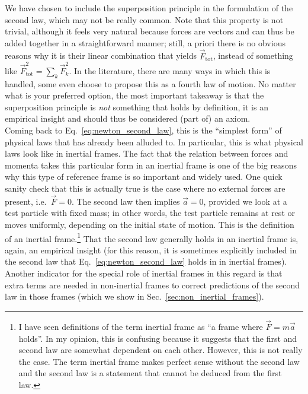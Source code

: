 \documentclass[../class_mech_main.tex]{subfiles}
\begin{document}
We have chosen to include the superposition principle in the formulation of the second law, which may not be really common. Note that this property is not trivial, although it feels very natural because forces are vectors and can thus be added together in a straightforward manner; still, a priori there is no obvious reasons why it is their linear combination that yields $\vec{F}_\mathrm{tot}$, instead of something like $\vec{F}_\mathrm{tot}^2 = \sum_k \vec{F}_k^2$. In the literature, there are many ways in which this is handled, some even choose to propose this as a fourth law of motion. No matter what is your preferred option, the most important takeaway is that the superposition principle is \emph{not} something that holds by definition, it is an empirical insight and should thus be considered (part of) an axiom.\\


Coming back to Eq.~\eqref{eq:newton_second_law}, this is the \enquote{simplest form} of physical laws that has already been alluded to. In particular, this is what physical laws look like in inertial frames. The fact that the relation between forces and momenta takes this particular form in an inertial frame is one of the big reasons why this type of reference frame is so important and widely used. One quick sanity check that this is actually true is the case where no external forces are present, i.e.~$\vec{F} = 0$. The second law then implies $\vec{a} = 0$, provided we look at a test particle with fixed mass; in other words, the test particle remains at rest or moves uniformly, depending on the initial state of motion. This is the definition of an inertial frame.\footnote{I have seen definitions of the term inertial frame as \enquote{a frame where $\vec{F} = m \vec{a}$ holds}. In my opinion, this is confusing because it suggests that the first and second law are somewhat dependent on each other. However, this is not really the case. The term inertial frame makes perfect sense without the second law and the second law is a statement that cannot be deduced from the first law.} That the second law generally holds in an inertial frame is, again, an empirical insight (for this reason, it is sometimes explicitly included in the second law that Eq.~\eqref{eq:newton_second_law} holds in in inertial frames). Another indicator for the special role of inertial frames in this regard is that extra terms are needed in non-inertial frames to correct predictions of the second law in those frames (which we show in Sec.~\ref{sec:non_inertial_frames}).
\end{document}
